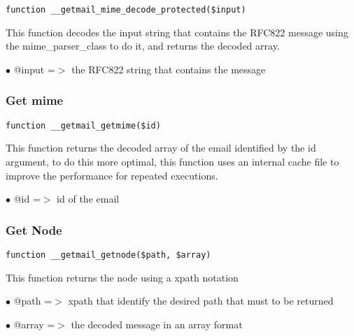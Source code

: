 \documentclass[a4paper]{article}
\begin{document}
\begin{lstlisting}
function __getmail_mime_decode_protected($input)
\end{lstlisting}

This function decodes the input string that contains the RFC822 message
using the mime\_parser\_class to do it, and returns the decoded array.

\begin{compactitem}
\item[\color{myblue}$\bullet$] @input =$>$ the RFC822 string that contains the message
\end{compactitem}

\hypertarget{toc79}{}
\subsubsection{Get mime}

\begin{lstlisting}
function __getmail_getmime($id)
\end{lstlisting}

This function returns the decoded array of the email identified by the id
argument, to do this more optimal, this function uses an internal cache
file to improve the performance for repeated executions.

\begin{compactitem}
\item[\color{myblue}$\bullet$] @id =$>$ id of the email
\end{compactitem}

\hypertarget{toc80}{}
\subsubsection{Get Node}

\begin{lstlisting}
function __getmail_getnode($path, $array)
\end{lstlisting}

This function returns the node using a xpath notation

\begin{compactitem}
\item[\color{myblue}$\bullet$] @path  =$>$ xpath that identify the desired path that must to be returned
\item[\color{myblue}$\bullet$] @array =$>$ the decoded message in an array format
\end{compactitem}

\hypertarget{toc81}{}
\end{document}

